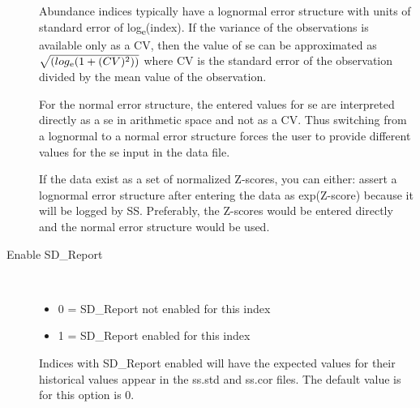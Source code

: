 \begin{description}
Abundance indices typically have a lognormal error structure with units of standard error of log\textsubscript{e}(index).  If the variance of the observations is available only as a CV, then the value of se can be approximated as $\sqrt{(log\textsubscript{e}(1+(CV)\textsuperscript{2}))}$ where CV is the standard error of the observation divided by the mean value of the observation.

For the normal error structure, the entered values for se are interpreted directly as a se in arithmetic space and not as a CV.  Thus switching from a lognormal to a normal error structure forces the user to provide different values for the se input in the data file.

If the data exist as a set of normalized Z-scores, you can either:  assert a lognormal error structure after entering the data as exp(Z-score) because it will be logged by SS.  Preferably, the Z-scores would be entered directly and the normal error structure would be used.

	\item[Enable SD\_Report]\
	\begin{itemize}
		\item 0 = SD\_Report not enabled for this index
		\item 1 = SD\_Report enabled for this index
	\end{itemize}

Indices with SD\_Report enabled will have the expected values for their historical values appear in the ss.std and ss.cor files. The default value is for this option is 0.

\end{description}

